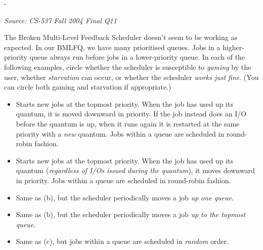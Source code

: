 \documentclass[11pt,a4paper]{article}
\makeatletter
\newcommand{\keepspace}[1]{\par\penalty-100\begingroup
  \setlength{\dimen@}{#1}\dimen@ii\pagegoal\advance\dimen@ii-\pagetotal
  \ifdim\dimen@>\dimen@ii\ifdim\dimen@ii>\z@\vfil\fi\break\fi\endgroup}
\newcounter{qn}[section]
\newenvironment{Qn}[4]{%
  \refstepcounter{qn}\keepspace{7\baselineskip}%
  \begin{tcolorbox}[qboxstyle, title={Q\thesection.\theqn\ \ [#1 \textbar\ #2]\ \ #4}]%
  {\footnotesize\color{g3}\textit{Source: #3}}\par\smallskip%
}{%
  \end{tcolorbox}%
}
\makeatother
\begin{document}
\begin{Qn}{Hard}{Lect 7}{CS-537 Fall 2004 Final Q11}{Broken MLFQ: gaming vs.\ starvation vs.\ works fine}
The Broken Multi-Level Feedback Scheduler doesn't seem to be working as expected. In our BMLFQ, we have many prioritised queues. Jobs in a higher-priority queue always run before jobs in a lower-priority queue. In each of the following examples, circle whether the scheduler is susceptible to \emph{gaming} by the user, whether \emph{starvation} can occur, or whether the scheduler \emph{works just fine}. (You can circle both gaming and starvation if appropriate.)
\begin{itemize}
  \item[(a)] Starts new jobs at the topmost priority. When the job has used up its quantum, it is moved downward in priority. If the job instead does an I/O before the quantum is up, when it runs again it is restarted at the same priority with a \emph{new} quantum. Jobs within a queue are scheduled in round-robin fashion.
  \item[(b)] Starts new jobs at the topmost priority. When the job has used up its quantum (\emph{regardless of I/Os issued during the quantum}), it moves downward in priority. Jobs within a queue are scheduled in round-robin fashion.
  \item[(c)] Same as (b), but the scheduler periodically moves a job \emph{up one queue}.
  \item[(d)] Same as (b), but the scheduler periodically moves a job \emph{up to the topmost queue}.
  \item[(e)] Same as (c), but jobs within a queue are scheduled in \emph{random} order.
\end{itemize}
\end{Qn}
\end{document}
